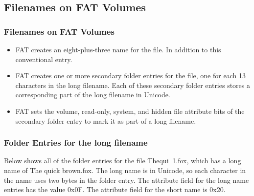 \subsection{Filenames on FAT Volumes} %
\begin{frame}[fragile]
    \frametitle{Filenames on FAT Volumes}
    \begin{itemize}
        \item FAT creates an {\color{red}eight-plus-three name} for the file. In addition to this conventional entry. 
        \item FAT creates {\color{red}one or more secondary folder entries} for the file, one for each 13 characters in the {\color{red}long filename}. Each of these secondary folder entries stores a corresponding part of the long filename in Unicode.
        \item FAT sets the volume, read-only, system, and hidden {\color{red}file attribute bits} of the secondary folder entry to mark it as part of a long filename. 
    \end{itemize}
\end{frame}
% 
% 
% 
\begin{frame}[fragile]
    \frametitle{Folder Entries for the long filename}
    Below shows all of the folder entries for the file {\color{red}Thequi $~$1.fox}, which has a long name of {\color{red}The quick brown.fox}. The long name is in Unicode, so each character in the name uses two bytes in the folder entry. The {\color{red}attribute field} for the long name entries has the value {\color{red}0x0F}. The attribute field for the short name is {\color{red}0x20}.
\end{frame}
